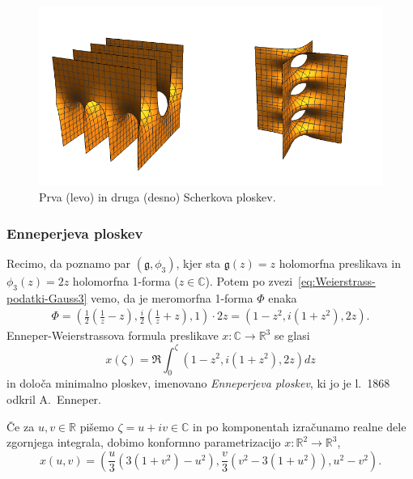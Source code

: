 \documentclass[12pt,a4paper,twoside]{article}
\theoremstyle{definition} %
\theoremstyle{plain} %
\numberwithin{equation}{section}  %
\begin{document}
\begin{figure}[h!]
\begin{center}
\includegraphics[scale=1.18]{images/scherk.pdf}
\caption{Prva (levo) in druga (desno) Scherkova ploskev.}
\end{center}
\end{figure}

\subsubsection{Enneperjeva ploskev}
%
Recimo, da poznamo par $(\mathfrak{g}, \phi_3)$, kjer sta $\mathfrak{g}(z) = z$ holomorfna preslikava in $\phi_3(z) = 2z$ holomorfna 1-forma ($z \in \mathbb{C}$).
Potem po zvezi~\eqref{eq:Weierstrass-podatki-Gauss3} vemo, da je meromorfna 1-forma $\Phi$ enaka
\begin{gather*}
\Phi = \left( \frac{1}{2} \left( \frac{1}{z} - z \right), \frac{i}{2} \left( \frac{1}{z} + z \right), 1 \right) \cdot 2z = \left( 1-z^2, i(1+z^2), 2z \right).
\end{gather*}
Enneper-Weierstrassova formula preslikave $x \colon \mathbb{C} \to \mathbb{R}^3$ se glasi
\begin{equation}
x(\zeta) = \Re \int_{0}^{\zeta} \left( 1-z^2, i(1+z^2), 2z \right) dz
\end{equation}
in določa minimalno ploskev, imenovano \emph{Enneperjeva ploskev}, ki jo je l.~1868 odkril A.~Enneper.

Če za $ u,v \in \mathbb{R}$ pišemo $\zeta = u + iv \in \mathbb{C}$ in po komponentah izračunamo realne dele zgornjega integrala, dobimo konformno parametrizacijo $x \colon \mathbb{R}^2 \to \mathbb{R}^3$,
\begin{equation}
x(u,v) = \left( \frac{u}{3} \left(3(1+v^2) - u^2 \right), \frac{v}{3} \left( v^2 - 3(1+u^2) \right), u^2 - v^2 \right).
\end{equation}
\end{document}

